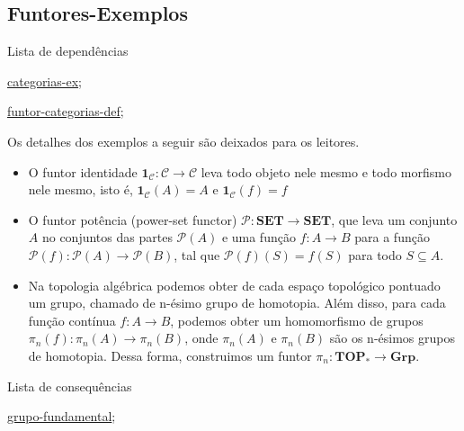 \subsection{Funtores-Exemplos}
\label{funtor-categorias-ex}
\begin{titlemize}{Lista de dependências}
	\item \hyperref[categorias-ex]{categorias-ex};\\
	\item \hyperref[funtor-categorias-def]{funtor-categorias-def};\\ %
\end{titlemize}

\begin{ex}
	Os detalhes dos exemplos a seguir são deixados para os leitores.
\begin{itemize}

    \item O funtor identidade $\mathbf{1}_{\mathcal{C}}: \mathcal{C} \longrightarrow \mathcal{C}$ leva todo objeto nele mesmo e todo morfismo nele mesmo, isto é, $\mathbf{1}_{\mathcal{C}}(A) = A$ e $\mathbf{1}_{\mathcal{C}}(f) = f$
    
    \item O funtor potência (power-set functor) $\mathcal{P}:\mathbf{SET} \longrightarrow \mathbf{SET}$, que leva um conjunto $A$ no conjuntos das partes $\mathcal{P}(A)$ e uma função $f:A \longrightarrow B$ para a função $\mathcal{P}(f): \mathcal{P}(A) \longrightarrow \mathcal{P}(B)$, tal que $\mathcal{P}(f)(S) = f(S)$ para todo $S \subseteq A$.

    \item Na topologia algébrica podemos obter de cada espaço topológico pontuado um grupo, chamado de n-ésimo grupo de homotopia. Além disso, para cada função contínua $f: A \longrightarrow B$, podemos obter um homomorfismo de grupos $\pi_n(f):\pi_n(A) \longrightarrow \pi_n(B)$, onde $\pi_n(A)$ e $\pi_n(B)$ são os n-ésimos grupos de homotopia. Dessa forma, construimos um funtor $\pi_n: \mathbf{TOP}_* \longrightarrow \mathbf{Grp}$. 

\end{itemize}
\end{ex}

 

\begin{titlemize}{Lista de consequências}
	\item \hyperref[grupo-fundamental]{grupo-fundamental};\\ %
\end{titlemize}
